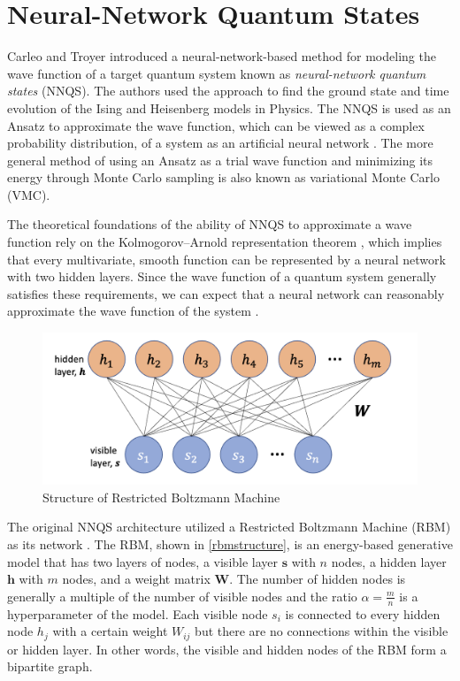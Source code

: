 \section{Neural-Network Quantum States}
Carleo and Troyer \cite{b20} introduced a neural-network-based method for modeling the wave function of a target quantum system known as \textit{neural-network quantum states} (NNQS). The authors used the approach to find the ground state and time evolution of the Ising and Heisenberg models in Physics. The NNQS is used as an Ansatz to approximate the wave function, which can be viewed as a complex probability distribution, of a system as an artificial neural network \cite{b25}. The more general method of using an Ansatz as a trial wave function and minimizing its energy through Monte Carlo sampling is also known as variational Monte Carlo (VMC).

The theoretical foundations of the ability of NNQS to approximate a wave function rely on the Kolmogorov–Arnold representation theorem \cite{kolmogorov1957representation}, which implies that every multivariate, smooth function can be represented by a neural network with two hidden layers. Since the wave function of a quantum system generally satisfies these requirements, we can expect that a neural network can reasonably approximate the wave function of the system \cite{b20}.

\begin{figure}[h!]
    \centering
    \includegraphics[width=0.9\linewidth]{images/rbm_diagram.png}
    \caption{Structure of Restricted Boltzmann Machine}
    \label{rbmstructure}
\end{figure}

The original NNQS architecture utilized a Restricted Boltzmann Machine (RBM) as its network \cite{b20}. The RBM, shown in \autoref{rbmstructure}, is an energy-based generative model that has two layers of nodes, a visible layer $\boldsymbol{s}$ with $n$ nodes, a hidden layer $\boldsymbol{h}$ with $m$ nodes, and a weight matrix $\mathbf{W}$. The number of hidden nodes is generally a multiple of the number of visible nodes and the ratio $\alpha = \frac{m}{n}$ is a hyperparameter of the model. Each visible node $s_i$ is connected to every hidden node $h_j$ with a certain weight $W_{ij}$ but there are no connections within the visible or hidden layer. In other words, the visible and hidden nodes of the RBM form a bipartite graph.

